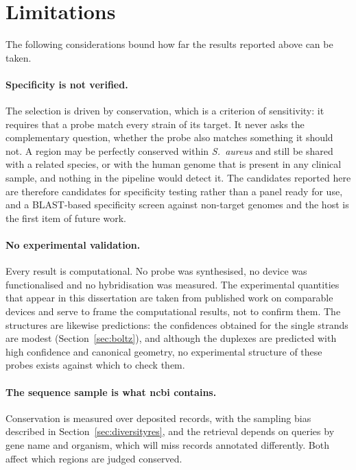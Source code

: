 \section{Limitations}
\label{sec:limitations}

The following considerations bound how far the results reported above can be taken.

\paragraph{Specificity is not verified.} The selection is driven by conservation, which is a
criterion of sensitivity: it requires that a probe match every strain of its target. It never asks
the complementary question, whether the probe also matches something it should not. A region may
be perfectly conserved within \emph{S.\ aureus} and still be shared with a related species, or
with the human genome that is present in any clinical sample, and nothing in the pipeline would
detect it. The candidates reported here are therefore candidates for specificity testing rather
than a panel ready for use, and a BLAST-based specificity screen against non-target genomes and
the host is the first item of future work.

\paragraph{No experimental validation.} Every result is computational. No probe was synthesised,
no device was functionalised and no hybridisation was measured. The experimental quantities that
appear in this dissertation are taken from published work on comparable devices
\citep{campos2019,purwidyantri2021} and serve to frame the computational results, not to confirm
them. The structures are likewise predictions: the confidences obtained for the single strands are
modest (Section~\ref{sec:boltz}), and although the duplexes are predicted with high confidence and
canonical geometry, no experimental structure of these probes exists against which to check them.

\paragraph{The sequence sample is what \acrshort{ncbi} contains.} Conservation is measured over
deposited records, with the sampling bias described in Section~\ref{sec:diversityres}, and the
retrieval depends on queries by gene name and organism, which will miss records annotated
differently. Both affect which regions are judged conserved.

